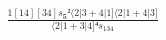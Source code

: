 \documentclass[varwidth, border=5pt]{standalone}
\begin{document}
\begin{my}
$\begin{gathered}
\scriptscriptstyle\frac{1[14][34]s_{𝟓}²⟨2|3+4|1]⟨2|1+4|3]}{⟨2|1+3|4]⁴s_{134}}
\end{gathered}$
\end{my}
\end{document}
